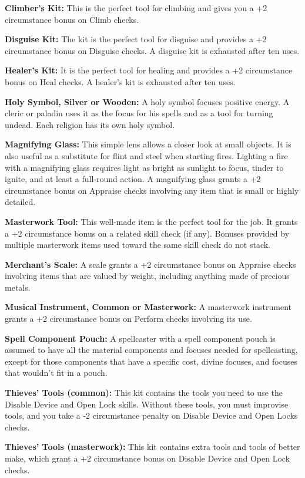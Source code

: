 \textbf{Climber's Kit:} This is the perfect tool for climbing and gives you a +2 
circumstance bonus on Climb checks.

\textbf{Disguise Kit:} The kit is the perfect tool for disguise and provides a 
+2 circumstance bonus on Disguise checks. A disguise kit is exhausted after ten 
uses.

\textbf{Healer's Kit:} It is the perfect tool for healing and provides a +2 circumstance 
bonus on Heal checks. A healer's kit is exhausted after ten uses.

\textbf{Holy Symbol, Silver or Wooden:} A holy symbol focuses positive energy. 
A cleric or paladin uses it as the focus for his spells and as a tool for turning 
undead. Each religion has its own holy symbol.

\textbf{Magnifying Glass:} This simple lens allows a closer look at small objects. 
It is also useful as a substitute for flint and steel when starting fires. Lighting 
a fire with a magnifying glass requires light as bright as sunlight to focus, tinder 
to ignite, and at least a full-round action. A magnifying glass grants a +2 circumstance 
bonus on Appraise checks involving any item that is small or highly detailed.

\textbf{Masterwork Tool:} This well-made item is the perfect tool for the job. 
It grants a +2 circumstance bonus on a related skill check (if any). Bonuses provided 
by multiple masterwork items used toward the same skill check do not stack.

\textbf{Merchant's Scale:} A scale grants a +2 circumstance bonus on Appraise 
checks involving items that are valued by weight, including anything made of precious 
metals.

\textbf{Musical Instrument, Common or Masterwork:} A masterwork instrument grants 
a +2 circumstance bonus on Perform checks involving its use.

\textbf{Spell Component Pouch:} A spellcaster with a spell component pouch is assumed 
to have all the material components and focuses needed for spellcasting, except 
for those components that have a specific cost, divine focuses, and focuses that 
wouldn't fit in a pouch.

\textbf{Thieves' Tools (common):} This kit contains the tools you need to use the Disable 
Device and Open Lock skills. Without these tools, you must improvise tools, and 
you take a -2 circumstance penalty on Disable Device and Open Locks checks.

\textbf{Thieves' Tools (masterwork):} This kit contains extra tools and tools of 
better make, which grant a +2 circumstance bonus on Disable Device and Open Lock 
checks.

